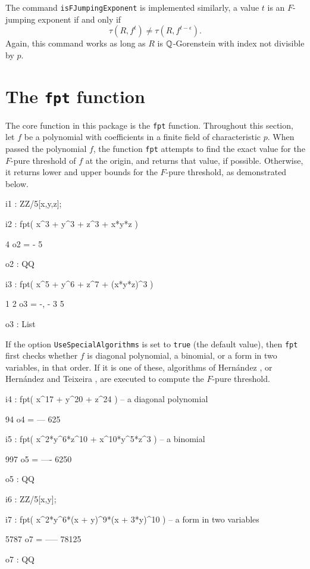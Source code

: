 \documentclass{amsart}
\begin{document}
The command {\tt isFJumpingExponent} is implemented similarly, a value $t$ is an $F$-jumping exponent if and only if
\[
\tau(R, f^t) \neq \tau(R, f^{t-\epsilon}).  
\]
Again, this command works as long as $R$ is $\mathbb{Q}$-Gorenstein with index not divisible by $p$. 


\newpage
\section{The {\tt fpt} function}
\label{sec.FPT}

The core function in this package is the {\tt fpt} function.  Throughout this section, let $f$ be a polynomial with coefficients in a finite field of characteristic $p$. When passed the polynomial $f$, the function {\tt fpt} attempts to find the exact value for the $F$-pure threshold of $f$ at the origin, and returns that value, if possible.  Otherwise, it returns lower and upper bounds for the $F$-pure threshold, as demonstrated below.
     
{\small
{}
\begin{MyVerbatim}

i1 : ZZ/5[x,y,z];

i2 : fpt( x^3 + y^3 + z^3 + x*y*z )

     4
o2 = -
     5

o2 : QQ

i3 : fpt( x^5 + y^6 + z^7 + (x*y*z)^3 )

      1  2
o3 = {-, -}
      3  5

o3 : List

\end{MyVerbatim}
}
            
             If the option {\tt UseSpecialAlgorithms} is set to {\tt true} (the default value), then {\tt fpt} first checks whether $f$ is diagonal polynomial, a binomial, or a form in two variables, in that order.
             If it is one of these, algorithms of Hern\'andez \cite{HernandezFInvariantsOfDiagonalHyp, HernandezFPureThresholdOfBinomial}, or Hern\'andez and Teixeira \cite{HernandezTeixeiraFThresholdFunctions},  are executed to compute the $F$-pure threshold.

{\small
{}
\begin{MyVerbatim}

i4 : fpt( x^17 + y^20 + z^24 ) -- a diagonal polynomial

      94
o4 = ---
     625
     
i5 : fpt( x^2*y^6*z^10 + x^10*y^5*z^3 ) -- a binomial

      997
o5 = ----
     6250

o5 : QQ     

i6 : ZZ/5[x,y];

i7 : fpt( x^2*y^6*(x + y)^9*(x + 3*y)^10 ) -- a form in two variables

      5787
o7 = -----
     78125

o7 : QQ

\end{MyVerbatim}
}
       
\end{document}
